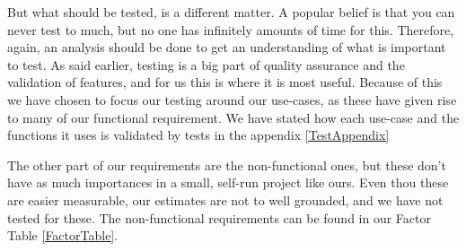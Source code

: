 But what should be tested, is a different matter. A popular belief is that you can never test to much, but no one has infinitely amounts of time for this. Therefore, again, an analysis should be done to get an understanding of what is important to test. As said earlier, testing is a big part of quality assurance and the validation of features, and for us this is where it is most useful. Because of this we have chosen to focus our testing around our use-cases, as these have given rise to many of our functional requirement. We have stated how each use-case and the functions it uses is validated by tests in the appendix \ref{TestAppendix}

The other part of our requirements are the non-functional ones, but these don't have as much importances in a small, self-run project like ours. Even thou these are easier measurable, our estimates are not to well grounded, and we have not tested for these. The non-functional requirements can be found in our Factor Table \ref{FactorTable}.

